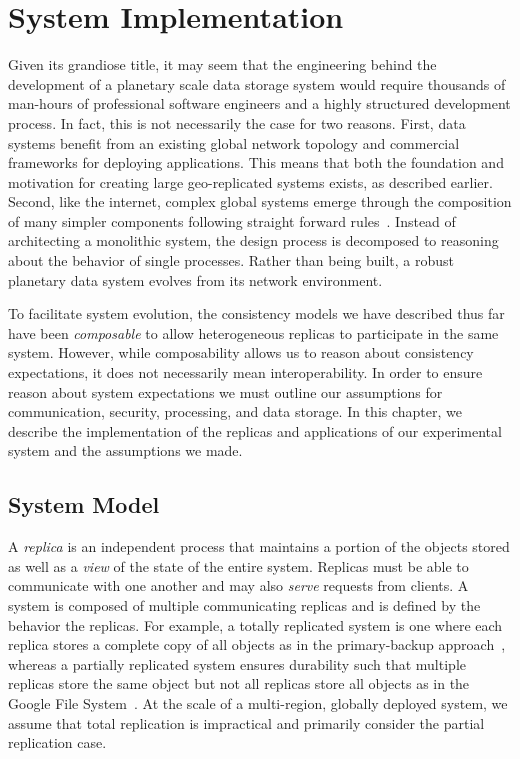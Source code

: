 
\renewcommand{\thechapter}{5}

\chapter{System Implementation}
\label{ch:system_implementation}

Given its grandiose title, it may seem that the engineering behind the development of a planetary scale data storage system would require thousands of man-hours of professional software engineers and a highly structured development process.
In fact, this is not necessarily the case for two reasons.
First, data systems benefit from an existing global network topology and commercial frameworks for deploying applications.
This means that both the foundation and motivation for creating large geo-replicated systems exists, as described earlier.
Second, like the internet, complex global systems emerge through the composition of many simpler components following straight forward rules~\cite{internet}.
Instead of architecting a monolithic system, the design process is decomposed to reasoning about the behavior of single processes.
Rather than being built, a robust planetary data system evolves from its network environment.

To facilitate system evolution, the consistency models we have described thus far have been \emph{composable} to allow heterogeneous replicas to participate in the same system.
However, while composability allows us to reason about consistency expectations, it does not necessarily mean interoperability.
In order to ensure reason about system expectations we must outline our assumptions for communication, security, processing, and data storage.
In this chapter, we describe the implementation of the replicas and applications of our experimental system and the assumptions we made.


\section{System Model}

A \emph{replica} is an independent process that maintains a portion of the objects stored as well as a \emph{view} of the state of the entire system.
Replicas must be able to communicate with one another and may also \emph{serve} requests from clients.
A system is composed of multiple communicating replicas and is defined by the behavior the replicas.
For example, a totally replicated system is one where each replica stores a complete copy of all objects as in the primary-backup approach~\cite{primary_backup}, whereas a partially replicated system ensures durability such that multiple replicas store the same object but not all replicas store all objects as in the Google File System~\cite{gfs}.
At the scale of a multi-region, globally deployed system, we assume that total replication is impractical and primarily consider the partial replication case.

